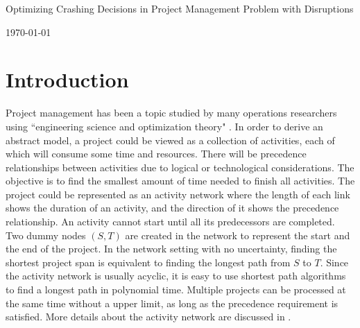 \documentclass[11pt]{article}
\newcommand{\ms}{\medskip}
\begin{document}
\baselineskip0.25in

\begin{center}
\begin{large}
\begin{bf}

Optimizing Crashing Decisions in Project Management Problem with Disruptions \ms

\today \ms
\end{bf}
\end{large}
\end{center}

\section{Introduction} \label{sec:intro}
	Project management has been a topic studied by many operations researchers using ``engineering science and optimization theory" \cite{soderlund2004building}. In order to derive an abstract model, a project could be viewed as a collection of activities, each of which will consume some time and resources. There will be precedence relationships between activities due to logical or technological considerations. The objective is to find the smallest amount of time needed to finish all activities. The project could be represented as an activity network where the length of each link shows the duration of an activity, and the direction of it shows the precedence relationship. An activity cannot start until all its predecessors are completed. Two dummy nodes \((S,T)\) are created in the network to represent the start and the end of the project. In the network setting with no uncertainty, finding the shortest project span is equivalent to finding the longest path from \(S\) to \(T\). Since the activity network is usually acyclic, it is easy to use shortest path algorithms to find a longest path in polynomial time. Multiple projects can be processed at the same time without a upper limit, as long as the precedence requirement is satisfied. More details about the activity network are discussed in \cite{Elmaghraby77}.\\
	\newline 
\end{document}
